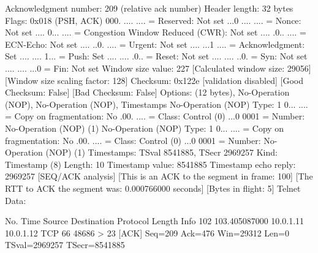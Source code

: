     Acknowledgment number: 209    (relative ack number)
    Header length: 32 bytes
    Flags: 0x018 (PSH, ACK)
        000. .... .... = Reserved: Not set
        ...0 .... .... = Nonce: Not set
        .... 0... .... = Congestion Window Reduced (CWR): Not set
        .... .0.. .... = ECN-Echo: Not set
        .... ..0. .... = Urgent: Not set
        .... ...1 .... = Acknowledgment: Set
        .... .... 1... = Push: Set
        .... .... .0.. = Reset: Not set
        .... .... ..0. = Syn: Not set
        .... .... ...0 = Fin: Not set
    Window size value: 227
    [Calculated window size: 29056]
    [Window size scaling factor: 128]
    Checksum: 0x122e [validation disabled]
        [Good Checksum: False]
        [Bad Checksum: False]
    Options: (12 bytes), No-Operation (NOP), No-Operation (NOP), Timestamps
        No-Operation (NOP)
            Type: 1
                0... .... = Copy on fragmentation: No
                .00. .... = Class: Control (0)
                ...0 0001 = Number: No-Operation (NOP) (1)
        No-Operation (NOP)
            Type: 1
                0... .... = Copy on fragmentation: No
                .00. .... = Class: Control (0)
                ...0 0001 = Number: No-Operation (NOP) (1)
        Timestamps: TSval 8541885, TSecr 2969257
            Kind: Timestamp (8)
            Length: 10
            Timestamp value: 8541885
            Timestamp echo reply: 2969257
    [SEQ/ACK analysis]
        [This is an ACK to the segment in frame: 100]
        [The RTT to ACK the segment was: 0.000766000 seconds]
        [Bytes in flight: 5]
Telnet
    Data: 

No.     Time           Source                Destination           Protocol Length Info
    102 103.405087000  10.0.1.11             10.0.1.12             TCP      66     48686 > 23 [ACK] Seq=209 Ack=476 Win=29312 Len=0 TSval=2969257 TSecr=8541885

